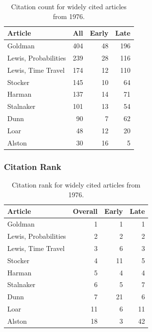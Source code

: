 \documentclass[
  10pt,
  letterpaper,
  DIV=11,
  numbers=noendperiod,
  twoside]{scrartcl}
\begin{document}
\begin{longtable}[]{@{}lrrr@{}}

\caption{\label{tbl-citation-count-1976}Citation count for widely cited
articles from 1976.}

\tabularnewline

\toprule\noalign{}
Article & All & Early & Late \\
\midrule\noalign{}
\endhead
\bottomrule\noalign{}
\endlastfoot
Goldman & 404 & 48 & 196 \\
Lewis, Probabilities & 239 & 28 & 116 \\
Lewis, Time Travel & 174 & 12 & 110 \\
Stocker & 145 & 10 & 64 \\
Harman & 137 & 14 & 71 \\
Stalnaker & 101 & 13 & 54 \\
Dunn & 90 & 7 & 62 \\
Loar & 48 & 12 & 20 \\
Alston & 30 & 16 & 5 \\

\end{longtable}

\subsubsection*{Citation Rank}\label{citation-rank}

\begin{longtable}[]{@{}lrrr@{}}

\caption{\label{tbl-citation-rank-1976}Citation rank for widely cited
articles from 1976.}

\tabularnewline

\toprule\noalign{}
Article & Overall & Early & Late \\
\midrule\noalign{}
\endhead
\bottomrule\noalign{}
\endlastfoot
Goldman & 1 & 1 & 1 \\
Lewis, Probabilities & 2 & 2 & 2 \\
Lewis, Time Travel & 3 & 6 & 3 \\
Stocker & 4 & 11 & 5 \\
Harman & 5 & 4 & 4 \\
Stalnaker & 6 & 5 & 7 \\
Dunn & 7 & 21 & 6 \\
Loar & 11 & 6 & 11 \\
Alston & 18 & 3 & 42 \\

\end{longtable}
\end{document}
